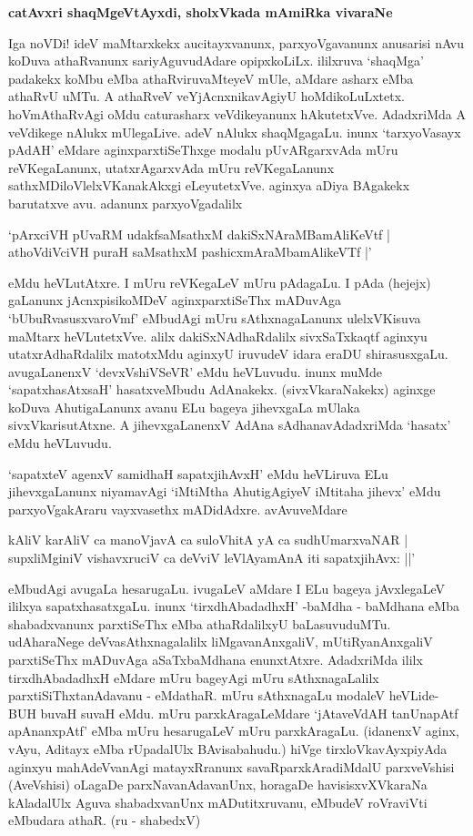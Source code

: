 {\bigskip
\noindent
{\large\bf catAvxri shaqMgeVtAyxdi, sholxVkada mAmiRka vivaraNe}}\label{page209}
\medskip

\noindent
Iga noVDi! ideV maMtarxkekx aucitayxvanunx, parxyoVgavanunx anusarisi nAvu koDuva athaRvanunx sariyAguvudAdare opipxkoLiLx. ililxruva `shaqMga' padakekx koMbu eMba athaRviruvaMteyeV mUle, aMdare asharx eMba athaRvU uMTu. A athaRveV veYjAcnxnikavAgiyU hoMdikoLuLxtetx. hoVmAthaR\-vAgi oMdu caturasharx veVdikeyanunx hAkutetxVve. AdadxriMda A veVdikege nAlukx mUlegaLive. adeV nAlukx shaqMgagaLu. inunx `tarxyoVasayx pAdAH' eMdare aginxparxtiSeThxge modalu pUvARgarxvAda mUru reVKegaLanunx, utatxrAgarxvAda mUru reVKegaLanunx sathxMDiloVlelxVKanakAkxgi eLeyutetxVve. aginxya aDiya BAgakekx barutatxve avu. adanunx parxyoVgadalilx

\smallskip
\begin{shloka}
`pArxciVH pUvaRM udakfsaMsathxM dakiSxNAraMBamAliKeVtf |\\\label{210}
athoVdiVciVH puraH saMsathxM pashicxmAraMbamAlikeVTf |'
\end{shloka}
\smallskip

\noindent
eMdu heVLutAtxre. I mUru reVKegaLeV mUru pAdagaLu. I pAda (hejejx) gaLanunx jAcnxpisi\-koMDeV aginxparxtiSeThx mADuvAga `bUbuRvasusxvaroVmf' eMbudAgi mUru sAthxnagaLanunx ulelxVKi\-suva maMtarx heVLutetxVve. alilx dakiSxNAdhaRdalilx sivxSaTxkaqtf aginxyu utatxrAdhaRdalilx matotxMdu aginxyU iruvudeV idara eraDU shirasusxgaLu. avugaLanenxV `devxVshiVSeVR' eMdu heVLuvudu. inunx muMde `sapatxhasAtxsaH' hasatxveMbudu AdAnakekx. (sivxVkaraNakekx) aginxge koDuva AhutigaLanunx avanu ELu bageya jihevxgaLa mUlaka sivxVkarisutAtxne. A jihevxgaLanenxV AdAna sAdhanavAdadxriMda `hasatx' eMdu heVLuvudu.

`sapatxteV agenxV samidhaH sapatxjihAvxH'\label{210} eMdu heVLiruva ELu jihevxgaLanunx niyamavAgi `iMtiMtha AhutigAgiyeV iMtitaha jihevx' eMdu parxyoVgakAraru vayxvasethx mADidAdxre. avAvuveMdare

\begin{shloka}
kAliV karAliV ca manoVjavA ca suloVhitA yA ca sudhUmarxvaNAR |\\\label{210}
supxliMginiV vishavxruciV ca deVviV leVlAyamAnA iti sapatxjihAvx: ||'
\end{shloka}

\noindent
eMbudAgi avugaLa hesarugaLu. ivugaLeV aMdare I ELu bageya jAvxlegaLeV ililxya sapatx\-hasatxgaLu. inunx `tirxdhAbadadhxH' -baMdha - baMdhana eMba shabadxvanunx parxtiSeThx eMba athaRdalilxyU baLa\-suvuduMTu. udAharaNege deVvasAthxnagalalilx liMgavanAnxgaliV, mUtiRyanAnxgaliV parxtiSeThx mADu\-vAga aSaTxbaMdhana enunxtAtxre. AdadxriMda ililx tirxdhAbadadhxH eMdare mUru bageyAgi mUru sAthxnagaLalilx parxti\-SiThxtanAdavanu - eMdathaR. mUru sAthxnagaLu modaleV heVLide- BUH buvaH suvaH eMdu. mUru parxkAragaLeMdare `jAtaveVdAH tanUnapAtf apAnanxpAtf' eMba mUru hesarugaLeV mUru parxkAra\-gaLu. (idanenxV aginx, vAyu, Aditayx eMba rUpadalUlx BAvisabahudu.) hiVge tirxloVkavAyxpi\-yAda aginxyu mahAdeVvanAgi matayxRranunx savaRparxkAradiMdalU parxveVshisi (AveVshisi) oLagaDe parxNavanAda\-vanUnx, horagaDe havisisxvXVkaraNa kAladalUlx Aguva shabadxvanUnx mADutitxruvanu, eMbudeV roVra\-viVti eMbudara athaR. (ru - shabedxV)

